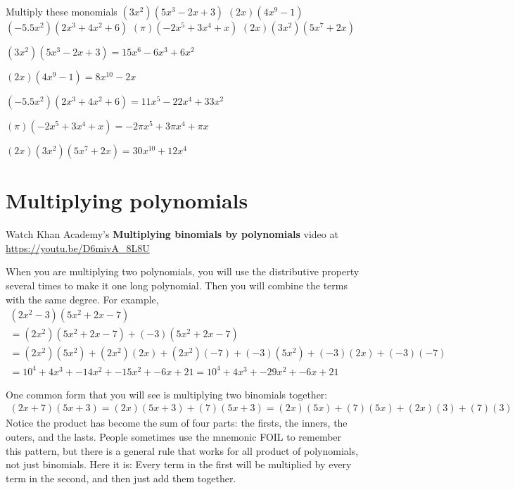 \begin{Exercise}[title={Multiplying a monomial and a polynomial}, label=multmonopoly]
Multiply these monomials
\Question $(3x^2)(5x^3 - 2x + 3)$
\vspace{20mm}
\Question $(2x)(4x^9 - 1)$
\vspace{20mm}
\Question $(-5.5x^2)(2x^3 + 4x^2 + 6)$
\vspace{20mm}
\Question $(\pi)(-2x^5 + 3x^4 + x)$
\vspace{20mm}
\Question $(2x)(3x^2)(5x^7 + 2x)$
\end{Exercise}
\begin{Answer}[ref=multmonopoly]
  $(3x^2)(5x^3 - 2x + 3) = 15x^6 - 6x^3 + 6x^2$

  $(2x)(4x^9 - 1) = 8x^{10} - 2x$

  $(-5.5x^2)(2x^3 + 4x^2 + 6) = 11x^5 - 22x^4 + 33x^2$

  $(\pi)(-2x^5 + 3x^4 + x) = -2\pi x^5 + 3\pi x^4 + \pi x$

  $(2x)(3x^2)(5x^7 + 2x) = 30x^{10} + 12x^4$
\end{Answer}

\section{Multiplying polynomials}

Watch Khan Academy's \textbf{Multiplying binomials by polynomials} video at \url{https://youtu.be/D6mivA_8L8U}

When you are multiplying two polynomials, you will use the
distributive property several times to make it one long
polynomial. Then you will combine the terms with the same degree. For
example,
\begin{multline*}
  (2x^2 - 3)(5x^2 + 2x - 7) \\
  =   (2x^2)(5x^2 + 2x - 7) + (-3)(5x^2 + 2x - 7) \\
  =   (2x^2)(5x^2) + (2x^2)(2x) + (2x^2)(-7) + (-3)(5x^2) + (-3)(2x) + (-3)(-7) \\
  =   10^4 + 4x^3 + -14x^2 + -15x^2 + -6x + 21
  =   10^4 + 4x^3 + -29x^2 + -6x + 21
\end{multline*}

One common form that you will see is multiplying two binomials together:
\begin{multline*}
(2x + 7)(5x + 3) = (2x)(5x + 3) + (7)(5x+3) = (2x)(5x) + (7)(5x) + (2x)(3) + (7)(3)
\end{multline*}
Notice the product has become the sum of four parts: the firsts, the
inners, the outers, and the lasts. People sometimes use the mnemonic
FOIL to remember this pattern, but there is a general rule that works
for all product of polynomials, not just binomials.  Here it is: Every
term in the first will be multiplied by every term in the second, and
then just add them together.

